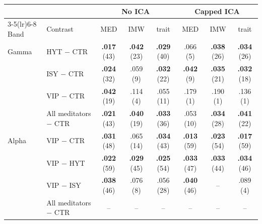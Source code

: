 \begin{tabular}{@{}llcccccc@{}}
\toprule
 & & \multicolumn{3}{c}{No ICA} & \multicolumn{3}{c}{Capped ICA} \\
\cmidrule(lr){3-5}\cmidrule(lr){6-8}
Band & Contrast & MED & IMW & trait & MED & IMW & trait \\
\midrule
Gamma & HYT $-$ CTR & \textbf{.017} (43) & \textbf{.042} (23) & \textbf{.029} (40) & .066 (5) & \textbf{.038} (26) & \textbf{.034} (26) \\
 & ISY $-$ CTR & \textbf{.024} (32) & .059 (9) & \textbf{.032} (22) & \textbf{.042} (9) & \textbf{.035} (21) & \textbf{.032} (18) \\
 & VIP $-$ CTR & \textbf{.042} (19) & .114 (4) & .055 (11) & .179 (1) & .190 (1) & .136 (1) \\
 & All meditators $-$ CTR & \textbf{.021} (43) & \textbf{.040} (19) & \textbf{.033} (36) & .053 (10) & \textbf{.034} (28) & \textbf{.041} (22) \\
\midrule
Alpha & VIP $-$ CTR & \textbf{.031} (48) & .065 (14) & \textbf{.034} (43) & \textbf{.013} (59) & \textbf{.023} (54) & \textbf{.017} (59) \\
 & VIP $-$ HYT & \textbf{.022} (59) & \textbf{.029} (45) & \textbf{.025} (54) & \textbf{.033} (47) & \textbf{.033} (44) & \textbf{.034} (46) \\
 & VIP $-$ ISY & \textbf{.038} (46) & .076 (8) & .056 (28) & \textbf{.040} (46) & -- & .089 (4) \\
 & All meditators $-$ CTR & -- & -- & -- & -- & -- & -- \\
\bottomrule
\end{tabular}
